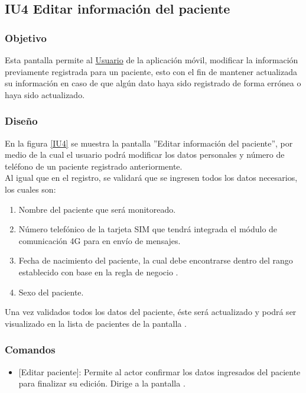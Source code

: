 \subsection{IU4 Editar información del paciente}

\subsubsection{Objetivo}
	
Esta pantalla permite al \hyperlink{actor:usuario}{Usuario} de la aplicación móvil, modificar la información previamente registrada para un paciente, esto con el fin de mantener actualizada su información en caso de que algún dato haya sido registrado de forma errónea o haya sido actualizado.

\subsubsection{Diseño}
En la figura \ref{IU4} se muestra la pantalla ''Editar información del paciente'', por medio de la cual el usuario podrá modificar los datos personales y número de teléfono de un paciente registrado anteriormente.\\

Al igual que en el registro, se validará que se ingresen todos los datos necesarios, los cuales son:
\begin{enumerate}
	\item Nombre del paciente que será monitoreado.
	\item Número telefónico de la tarjeta SIM que tendrá integrada el módulo de comunicación 4G para en envío de mensajes.
	\item Fecha de nacimiento del paciente, la cual debe encontrarse dentro del rango establecido con base en la regla de negocio .
	\item Sexo del paciente.
\end{enumerate}

Una vez validados todos los datos del paciente, éste será actualizado y podrá ser visualizado en la lista de pacientes de la pantalla .

    

\subsubsection{Comandos}
	\begin{itemize}
		\item \btnRegistrar{} [Editar paciente]: Permite al actor confirmar los datos ingresados del paciente para finalizar su edición. Dirige a la pantalla .
	\end{itemize}
\clearpage